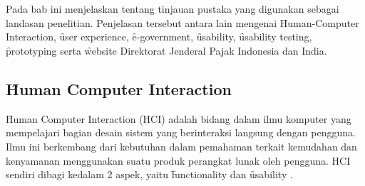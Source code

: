 \chapter{\babDua}
Pada bab ini menjelaskan tentang tinjauan pustaka yang digunakan sebagai landasan penelitian.
Penjelasan tersebut antara lain mengenai \f{Human-Computer Interaction}, \f{user experience}, \f{e-government},
\f{usability}, \f{usability testing}, \f{prototyping} serta \f{website} Direktorat Jenderal Pajak Indonesia dan India.

\section{\f{Human Computer Interaction}}
\f{Human Computer Interaction} (HCI) adalah bidang dalam ilmu komputer yang mempelajari bagian desain sistem yang berinteraksi langsung dengan pengguna. Ilmu ini berkembang dari kebutuhan dalam pemahaman terkait kemudahan dan kenyamanan menggunakan suatu produk perangkat lunak oleh pengguna. HCI sendiri dibagi kedalam 2 aspek, yaitu \f{functionality} dan \f{usability} \citep{paper.mathew}. 
